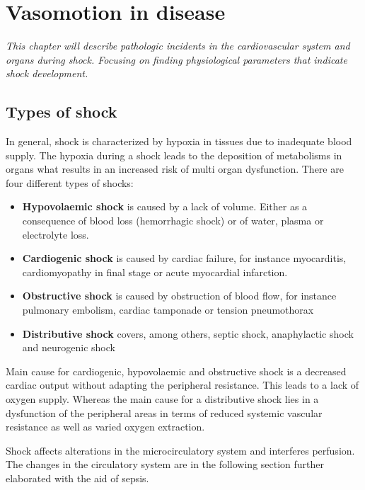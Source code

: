 \chapter{Vasomotion in disease}
\textit{This chapter will describe pathologic incidents in the cardiovascular system and organs during shock. Focusing on finding physiological parameters that indicate shock development.}

\section{Types of shock}
In general, shock is characterized by hypoxia in tissues due to inadequate blood supply. The hypoxia during a shock leads to the deposition of metabolisms in organs what results in an increased risk of multi organ dysfunction. 
There are four different types of shocks:\cite{lauridsen2015,vincent2013}
\begin{itemize}
	\item \textbf{Hypovolaemic shock} is caused by a lack of volume. Either as a consequence of blood loss (hemorrhagic shock) or of water, plasma or electrolyte loss.
	\item \textbf{Cardiogenic shock} is caused by cardiac failure, for instance myocarditis, cardiomyopathy in final stage or acute myocardial infarction.
	\item \textbf{Obstructive shock} is caused by obstruction of blood flow, for instance pulmonary embolism, cardiac tamponade or tension pneumothorax 
	\item \textbf{Distributive shock} covers, among others, septic shock, anaphylactic shock and neurogenic shock
\end{itemize}

Main cause for cardiogenic, hypovolaemic and obstructive shock is a decreased cardiac output without adapting the peripheral resistance. This leads to a lack of oxygen supply.
Whereas the main cause for a distributive shock lies in a dysfunction of the peripheral areas in terms of reduced systemic vascular resistance as well as varied oxygen extraction.\cite{vincent2013}

Shock affects alterations in the microcirculatory system and interferes perfusion\cite{maier2013}. The changes in the circulatory system are in the following section further elaborated with the aid of sepsis.